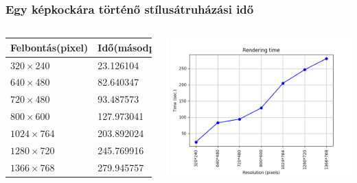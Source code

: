\documentclass{beamer}
\begin{document}
	\begin{frame}
		\frametitle{Egy képkockára történő stílusátruházási idő}
		
		\begin{columns}
			\begin{tabular}{ | l | l |}
				\hline
				Felbontás(pixel) & Idő(másodperc) \\ \hline
				$320 \times $240 & 23.126104 \\ \hline
				$640 \times $480 & 82.640347 \\ \hline
				$720 \times $480 & 93.487573 \\ \hline
				$800 \times $600 & 127.973041 \\ \hline
				$1024 \times $764 & 203.892024 \\ \hline
				$1280 \times $720 & 245.769916 \\ \hline
				$1366 \times $768 & 279.945757 \\ \hline
			\end{tabular}
			\includegraphics[scale=0.4]{time_per_res.png}
		\end{columns}
	\end{frame}
\end{document}

